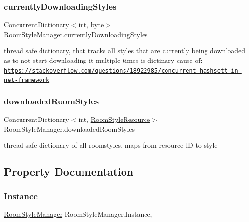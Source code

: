 \subsubsection{\texorpdfstring{currently\+Downloading\+Styles}{currentlyDownloadingStyles}}
{\footnotesize\ttfamily Concurrent\+Dictionary$<$int, byte$>$ Room\+Style\+Manager.\+currently\+Downloading\+Styles\hspace{0.3cm}{\ttfamily [private]}}





thread safe dictionary, that tracks all styles that are currently being downloaded as to not start downloading it multiple times is dictinary cause of\+: \href{https://stackoverflow.com/questions/18922985/concurrent-hashsett-in-net-framework}{\tt https\+://stackoverflow.\+com/questions/18922985/concurrent-\/hashsett-\/in-\/net-\/framework} \mbox{\label{class_room_style_manager_a03aaf980c4dccbd54255045c852d6016}} 
\subsubsection{\texorpdfstring{downloaded\+Room\+Styles}{downloadedRoomStyles}}
{\footnotesize\ttfamily Concurrent\+Dictionary$<$int, \mbox{\hyperlink{class_room_style_resource}{Room\+Style\+Resource}}$>$ Room\+Style\+Manager.\+downloaded\+Room\+Styles\hspace{0.3cm}{\ttfamily [private]}}





thread safe dictionary of all roomstyles, maps from resource ID to style 

\subsection{Property Documentation}
\mbox{\label{class_room_style_manager_aa4bee6c020c8d25f983a975e952afd02}} 
\subsubsection{\texorpdfstring{Instance}{Instance}}
{\footnotesize\ttfamily \mbox{\hyperlink{class_room_style_manager}{Room\+Style\+Manager}} Room\+Style\+Manager.\+Instance\hspace{0.3cm}{\ttfamily [static]}, {\ttfamily [get]}}



